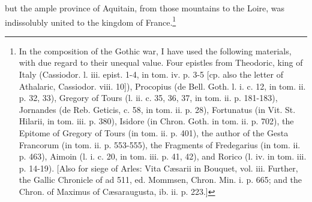 but the ample province of Aquitain, from those mountains to the Loire, was indissolubly united to the kingdom of France.\footnote{In the composition of the Gothic war, I have used the following materials, with due regard to their unequal value. Four epistles from Theodoric, king of Italy (Cassiodor. l. iii. epist. 1-4, in tom. iv. p. 3-5 [cp. also the letter of Athalaric, Cassiodor. viii. 10]), Procopius (de Bell. Goth. l. i. c. 12, in tom. ii. p. 32, 33), Gregory of Tours (l. ii. c. 35, 36, 37, in tom. ii. p. 181-183), Jornandes (de Reb. Geticis, c. 58, in tom. ii. p. 28), Fortunatus (in Vit. St. Hilarii, in tom. iii. p. 380), Isidore (in Chron. Goth. in tom. ii. p. 702), the Epitome of Gregory of Tours (in tom. ii. p. 401), the author of the Gesta Francorum (in tom. ii. p. 553-555), the Fragments of Fredegarius (in tom. ii. p. 463), Aimoin (l. i. c. 20, in tom. iii. p. 41, 42), and Rorico (l. iv. in tom. iii. p. 14-19). [Also for siege of Arles: Vita Cæsarii in Bouquet, vol. iii. Further, the Gallic Chronicle of ad 511, ed. Mommsen, Chron. Min. i. p. 665; and the Chron. of Maximus of Cæsaraugusta, ib. ii. p. 223.]}

